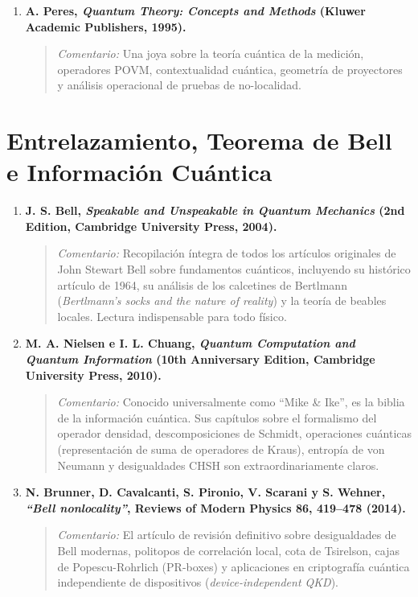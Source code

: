 \documentclass[11pt,a4paper,twoside]{report}
\theoremstyle{definition}
\theoremstyle{plain}
\theoremstyle{remark}
\begin{document}
\begin{enumerate}
    \item \textbf{A. Peres, \textit{Quantum Theory: Concepts and Methods} (Kluwer Academic Publishers, 1995).}
    \begin{quote}
        \textit{Comentario:} Una joya sobre la teoría cuántica de la medición, operadores POVM, contextualidad cuántica, geometría de proyectores y análisis operacional de pruebas de no-localidad.
    \end{quote}
\end{enumerate}

\section{Entrelazamiento, Teorema de Bell e Información Cuántica}

\begin{enumerate}
    \item \textbf{J. S. Bell, \textit{Speakable and Unspeakable in Quantum Mechanics} (2nd Edition, Cambridge University Press, 2004).}
    \begin{quote}
        \textit{Comentario:} Recopilación íntegra de todos los artículos originales de John Stewart Bell sobre fundamentos cuánticos, incluyendo su histórico artículo de 1964, su análisis de los calcetines de Bertlmann (\textit{Bertlmann's socks and the nature of reality}) y la teoría de beables locales. Lectura indispensable para todo físico.
    \end{quote}

    \item \textbf{M. A. Nielsen e I. L. Chuang, \textit{Quantum Computation and Quantum Information} (10th Anniversary Edition, Cambridge University Press, 2010).}
    \begin{quote}
        \textit{Comentario:} Conocido universalmente como ``Mike \& Ike'', es la biblia de la información cuántica. Sus capítulos sobre el formalismo del operador densidad, descomposiciones de Schmidt, operaciones cuánticas (representación de suma de operadores de Kraus), entropía de von Neumann y desigualdades CHSH son extraordinariamente claros.
    \end{quote}

    \item \textbf{N. Brunner, D. Cavalcanti, S. Pironio, V. Scarani y S. Wehner, \textit{``Bell nonlocality''}, Reviews of Modern Physics 86, 419--478 (2014).}
    \begin{quote}
        \textit{Comentario:} El artículo de revisión definitivo sobre desigualdades de Bell modernas, politopos de correlación local, cota de Tsirelson, cajas de Popescu-Rohrlich (PR-boxes) y aplicaciones en criptografía cuántica independiente de dispositivos (\textit{device-independent QKD}).
    \end{quote}


\end{enumerate}
\end{document}
